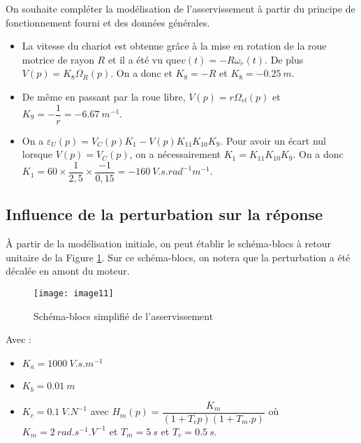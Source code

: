 On souhaite compléter la modélisation de l'asservissement à partir du principe de fonctionnement fourni et des données générales.

\ifprof
\begin{corrige}
\begin{itemize}
\item La vitesse du chariot est obtenue grâce à la mise en rotation de la roue motrice de rayon $R$ et il a été vu que$v(t)=-R\omega_r(t)$. De plus $V(p)=K_8\Omega_R(p)$. On a donc et $K_8 = -R$ et $K_8 = -\SI{0,25}{m}$.
\item De même en passant par la roue libre, $V(p)=r \Omega_{rl}(p)$ et $K_9 = -\dfrac{1}{r} = -\SI{6,67}{m^{-1}}$.
\item On a $\varepsilon_U(p)=V_C(p)K_1 - V(p) K_{11}K_{10}K_9$. Pour avoir un écart nul lorsque $V(p)=V_C(p)$, on a nécessairement $K_1 = K_{11}K_{10}K_9$. On a donc  $K_1 = 60\times \dfrac{1}{2,5}\times \dfrac{-1}{0,15}=  - \SI{160}{V.s.rad^{-1} m^{-1}}$.
\end{itemize}
\end{corrige}
\else
\fi


\subsection{Influence de la perturbation sur la réponse}
À partir de la modélisation initiale, on peut établir le schéma-blocs à retour unitaire de la Figure \ref{fig:CCMP:2021:11}. Sur ce schéma-blocs, on notera que la perturbation a été décalée en amont du moteur.
 

\begin{figure}[!h]
\centering
\texttt{[image: image11]}
\caption{ \label{fig:CCMP:2021:11} Schéma-blocs simplifié de l'asservissement}
\end{figure}  
 
Avec :
\begin{itemize}
\item $K_a=\SI{1000}{V.s.m^{-1}}$
\item $K_b=\SI{0,01}{m}$
\item $K_c=\SI{0,1}{V.N^{-1}}$ avec $H_m (p)= \dfrac{K_m}{\left(1+T_e p\right) \left(1+T_m.p\right) }$
où $K_m=\SI{2}{rad.s^{-1}.V^{-1}}$ et $T_m=\SI{5}{s}$ et $T_e=\SI{0,5}{s}$.
\end{itemize}	
 

